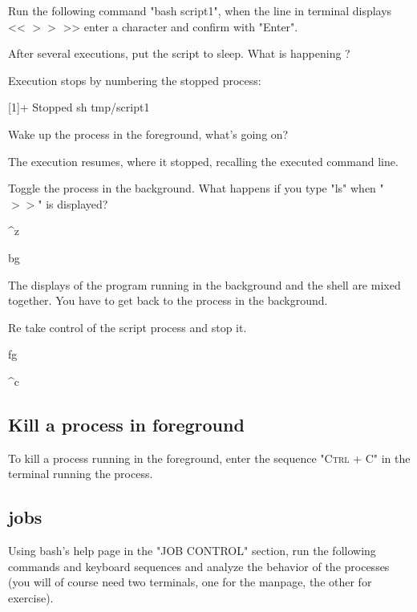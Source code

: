 \documentclass[11pt]{article}
\begin{document}
Run the following command "bash script1", when the line in terminal displays << $ >> $ >> enter a character and confirm with "Enter".

After several executions, put the script to sleep. What is happening ?


\begin{solution}
Execution stops by numbering the stopped process:

[1]+  Stopped                 sh tmp/script1
\end{solution}

Wake up the process in the foreground, what's going on?

\begin{solution}
The execution resumes, where it stopped, recalling the executed command line.
\end{solution}

Toggle the process in the background. What happens if you type "ls" when  "$ >> $" is displayed?

\begin{solution}

\^{}z

bg

The displays of the program running in the background and the shell are mixed together. You have to get back to the process in the background.

\end{solution}

Re take control of the script process and stop it.

\begin{solution}

fg

\^{}c
\end{solution}

\subsection{Kill a process in foreground}

To kill a process running in the foreground, enter the sequence \textsc{"Ctrl + C"} in the terminal running the process.

\subsection{jobs}

Using bash's help page in the "JOB CONTROL" section, run the following commands and keyboard sequences and analyze the behavior of the processes (you will of course need two terminals, one for the manpage, the other for exercise).
\end{document}
